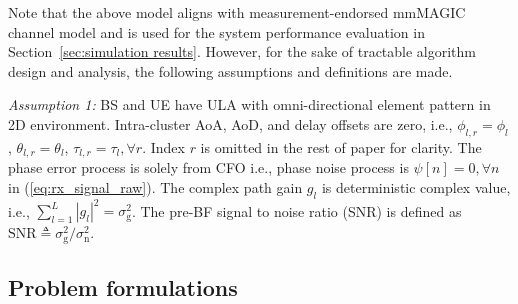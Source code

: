 \documentclass[journal]{IEEEtran}
\newcommand{\tx}[0]{\text{T}}
\newcommand{\rx}[0]{\text{R}}
\newcommand{\hermitian}[0]{\text{H}}
\newcommand{\transpose}[0]{\text{T}}
\newcommand{\sigman}[0]{\sigma_{\text{n}}}
\newcommand{\SNR}[0]{\mathrm{SNR}}
\begin{document}
\color{black}Note that the above model aligns with measurement-endorsed mmMAGIC channel model \cite{mmMAGIC_model} and is used for the system performance evaluation in Section~\ref{sec:simulation results}. However, for the sake of tractable algorithm design and analysis, the following assumptions and definitions are made.\color{black}

\textit{Assumption 1:} BS and UE have ULA with omni-directional element pattern in 2D environment. Intra-cluster AoA, AoD, and delay offsets are zero, i.e., $\phi_{l,r} = \phi_{l}$, $\theta_{l,r}=\theta_{l}$, $\tau_{l,r} =\tau_{l}, \forall r$. Index $r$ is omitted in the rest of paper for clarity. The phase error process is solely from CFO i.e., phase noise process is $\psi[n]=0,\forall n$ in (\ref{eq:rx_signal_raw}). The complex path gain $g_l$ is deterministic complex value, i.e., $\sum_{l=1}^{L}|g_l|^2=\sigma^2_{\text{g}}$. The pre-BF signal to noise ratio (SNR) is defined as $\SNR \triangleq\sigma^2_{\text{g}}/\sigman^2$.





%
%
\subsection{Problem formulations}
\end{document}
